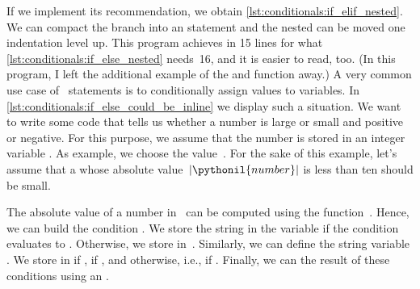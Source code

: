 If we implement its recommendation, we obtain \cref{lst:conditionals:if_elif_nested}.
We can compact the  branch into an  statement and the nested  can be moved one indentation level up.
This program achieves in 15 lines for what \cref{lst:conditionals:if_else_nested} needs~16, and it is easier to read, too.
(In this program, I left the additional example of the  and  function away.)%
%
%
%
\FloatBarrier%
\endhsection%
%
%
\label{sec:inlineIfThenElse}%
%
%
%
%
%
%
%
A very common use case of ~statements is to conditionally assign values to variables.
In \cref{lst:conditionals:if_else_could_be_inline} we display such a situation.
We want to write some code that tells us whether a number is large or small and positive or negative.
For this purpose, we assume that the number is stored in an integer variable .
As example, we choose the value~.
For the sake of this example, let's assume that a  whose absolute value~$|\pythonil{number}|$ is less than ten should be small.

The absolute value of a number in \python\ can be computed using the function~.
Hence, we can build the condition .
We store the string  in the variable  if the condition evaluates to .
Otherwise, we store  in~.
Similarly, we can define the string variable .
We store  in  if ,  if , and  otherwise, i.e., if .
Finally, we can  the result of these conditions using an .

